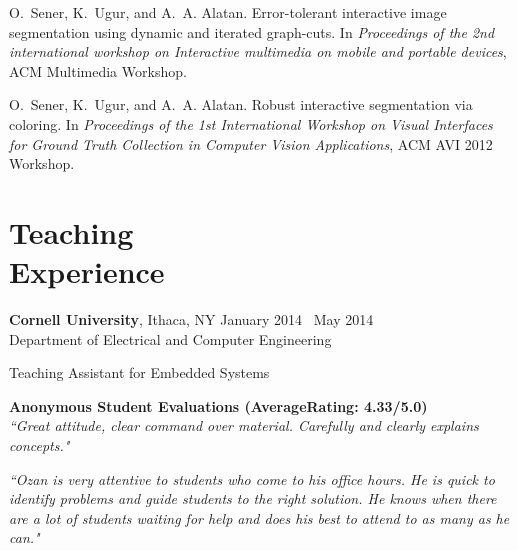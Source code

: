 \documentclass[margin,line,10pt]{resume}
\begin{document}
\begin{resume}
	O.~Sener, K.~Ugur, and A.~A. Alatan.
	\newblock Error-tolerant interactive image segmentation using dynamic and iterated graph-cuts.
	\newblock In {\em Proceedings of the 2nd international workshop on Interactive multimedia on mobile and portable devices}, ACM Multimedia Workshop.

    O.~Sener, K.~Ugur, and A.~A. Alatan.
	\newblock Robust interactive segmentation via coloring.
	\newblock In {\em Proceedings of the 1st International Workshop on Visual
  	Interfaces for Ground Truth Collection in Computer Vision Applications},
  	ACM AVI 2012 Workshop.











\iffalse
\section{\mysidestyle \textcolor{olgray}{Teaching\\Experience}}
\textbf{Cornell University}, Ithaca, NY \hfill January 2014 \textendash ~May 2014 \vspace{0mm}\\\vspace{0mm}%
Department of Electrical and Computer Engineering \hfill \vspace{-7mm}\\\vspace{0mm}

Teaching Assistant for Embedded Systems  \hfill \vspace{0mm}\\\vspace{0mm}
\vspace{-4mm}

\textbf{Anonymous Student Evaluations (AverageRating: 4.33/5.0)} \\
\emph{``Great attitude, clear command over material. Carefully and clearly explains concepts."}

\emph{``Ozan is very attentive to students who come to his office hours. He is quick to identify problems and guide students to the right solution. He knows when there are a lot of students waiting for help and does his best to attend to as many as he can."}


\end{resume}
\end{document}
